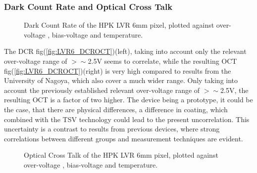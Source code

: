 \documentclass[12pt,article,type=msc,colorback,accentcolor=tud9c]{tudthesis}
\begin{document}
\subsubsection{Dark Count Rate and Optical Cross Talk}
\label{subsubsec:LVR6DCROCT}
\begin{figure}[h]
\begin{centering}
\caption[LCT5 LVR 6mm DCR]{Dark Count Rate of the HPK LVR 6mm pixel, plotted against over-voltage , bias-voltage and temperature.}
\label{fig:LVR6_DCR}
\end{centering}
\end{figure}
The DCR fig(\ref{fig:LVR6_DCROCT})(left), taking into account only the relevant over-voltage range of $>\sim$2.5V seems to correlate, while the resulting OCT fig(\ref{fig:LVR6_DCROCT})(right) is very high compared to results from the University of Nagoya, which also cover a much wider range. Only taking into account the previously established relevant over-voltage range of $>\sim$2.5V, the resulting OCT is a factor of two higher. The device being a prototype, it could be the case, that there are physical differences, a difference in coating, which combined with the TSV technology could lead to the present uncorrelation\cite{Yamamoto}. This uncertainty is a contrast to results from previous devices, where strong correlations between different groups and measurement techniques are evident.
\begin{figure}[h]
\begin{centering}
\caption[LCT5 LVR 6mm OCT]{Optical Cross Talk of the HPK LVR 6mm pixel, plotted against over-voltage , bias-voltage and temperature.}
\label{fig:LVR6_OCT}
\end{centering}
\end{figure}


\clearpage
\end{document}
